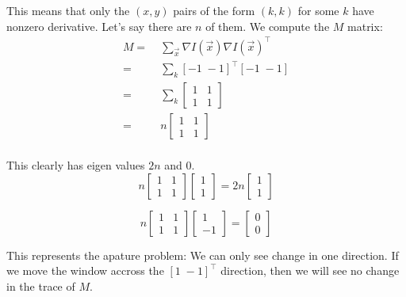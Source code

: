 \documentclass[11pt,english]{article}
\begin{document}
\begin{enumerate}
This means that only the $(x,y)$ pairs of the form $(k,k)$ for some $k$ have nonzero derivative. Let's say
there are $n$ of them. We compute the
$M$ matrix:
\begin{align*}
M 
=&\; \sum_{\vec{x}} \nabla I(\vec{x}) \nabla I(\vec{x})^\top \\
=&\; \sum_{k} [-1 \; -1 ]^\top [ -1 \; -1 ]  \\
=&\; \sum_{k}
        \begin{bmatrix}
           1 & 1 \\
           1 & 1 
        \end{bmatrix} \\
=&\; n  \begin{bmatrix}
           1 & 1 \\
           1 & 1 
        \end{bmatrix} \\
\end{align*}

This clearly has eigen values $2n$ and $0$.
\[
n \begin{bmatrix}
           1 & 1 \\
           1 & 1 
   \end{bmatrix} 
 \begin{bmatrix}
           1  \\
           1  
   \end{bmatrix} =
 2n \begin{bmatrix}
           1  \\
           1  
   \end{bmatrix} 
\]

\[
n \begin{bmatrix}
           1 & 1 \\
           1 & 1 
   \end{bmatrix} 
 \begin{bmatrix}
           1  \\
          -1  
   \end{bmatrix} =
   \begin{bmatrix}
           0  \\
           0  
   \end{bmatrix} 
\]

This represents the apature problem: We can only see change in one direction. If we move the window accross the
$[ 1 \; -1 ]^\top$ direction, then we will see no change in the trace of $M$. 


\end{enumerate}
\end{document}
